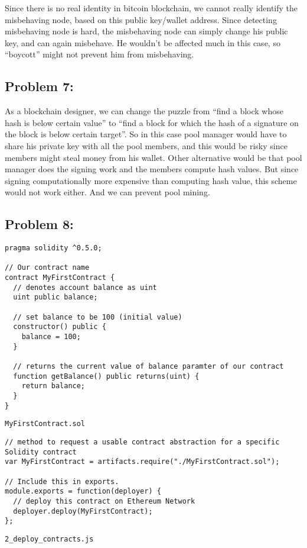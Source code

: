 \documentclass[a4paper]{article}
\begin{document}
Since there is no real identity in
bitcoin blockchain, we cannot really identify the misbehaving node, based on this public key/wallet address.
Since detecting misbehaving node is hard, the misbehaving node can simply change his public key, and
can again misbehave. He wouldn't be affected much in this case, so ``boycott'' might not prevent him from misbehaving.

\subsection*{Problem 7:}
As a blockchain designer, we can change the puzzle from ``find a block whose hash is below certain value'' to
``find a block for which the hash of a signature on the block is below certain target''. So in this case
pool manager would have to share his private key with all the pool members, and this would be risky
since members might steal money from his wallet. Other alternative would be that pool manager does the signing work
and the members compute hash values. But since signing computationally more expensive than computing hash value,
this scheme would not work either. And we can prevent pool mining.

\subsection*{Problem 8:}
\begin{lstlisting}[style=C++]
pragma solidity ^0.5.0;

// Our contract name
contract MyFirstContract {
  // denotes account balance as uint
  uint public balance;
  
  // set balance to be 100 (initial value)     
  constructor() public {
    balance = 100;
  }

  // returns the current value of balance paramter of our contract
  function getBalance() public returns(uint) {
    return balance;
  }
}
\end{lstlisting}
\texttt{MyFirstContract.sol} \\


\begin{lstlisting}[style=C++]
// method to request a usable contract abstraction for a specific Solidity contract
var MyFirstContract = artifacts.require("./MyFirstContract.sol");

// Include this in exports.
module.exports = function(deployer) {
  // deploy this contract on Ethereum Network
  deployer.deploy(MyFirstContract);
};
\end{lstlisting}
\texttt{2\_deploy\_contracts.js} \\
\end{document}
